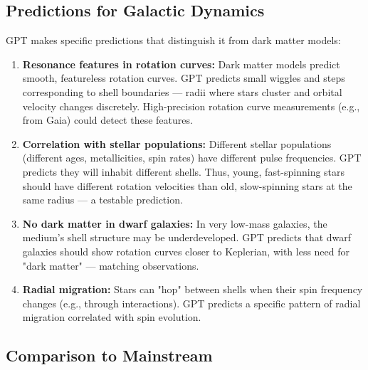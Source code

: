 \documentclass[12pt, a4paper]{article}
\begin{document}
\subsection{Predictions for Galactic Dynamics}
\label{subsec:galactic_predictions}

GPT makes specific predictions that distinguish it from dark matter models:

\begin{enumerate}
    \item \textbf{Resonance features in rotation curves:} Dark matter models predict smooth, featureless rotation curves. GPT predicts small wiggles and steps corresponding to shell boundaries — radii where stars cluster and orbital velocity changes discretely. High-precision rotation curve measurements (e.g., from Gaia) could detect these features.
    
    \item \textbf{Correlation with stellar populations:} Different stellar populations (different ages, metallicities, spin rates) have different pulse frequencies. GPT predicts they will inhabit different shells. Thus, young, fast-spinning stars should have different rotation velocities than old, slow-spinning stars at the same radius — a testable prediction.
    
    \item \textbf{No dark matter in dwarf galaxies:} In very low-mass galaxies, the medium's shell structure may be underdeveloped. GPT predicts that dwarf galaxies should show rotation curves closer to Keplerian, with less need for "dark matter" — matching observations.
    
    \item \textbf{Radial migration:} Stars can "hop" between shells when their spin frequency changes (e.g., through interactions). GPT predicts a specific pattern of radial migration correlated with spin evolution.
\end{enumerate}

\subsection{Comparison to Mainstream}
\label{subsec:darkmatter_comparison}
\end{document}
